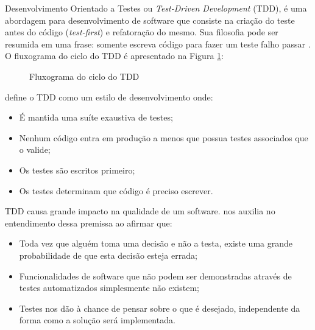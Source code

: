 Desenvolvimento Orientado a Testes ou \textit{Test-Driven Development} (TDD), é uma abordagem para desenvolvimento de software que consiste na criação do teste antes do código (\textit{test-first}) e refatoração do mesmo. Sua filosofia pode ser resumida em uma frase: somente escreva código para fazer um teste falho passar \cite{KOSKELA}. O fluxograma do ciclo do TDD é apresentado na Figura \ref{tdd}:

\begin{figure}[ht]
    \centering
    \caption{Fluxograma do ciclo do TDD}
    \label{tdd}
\end{figure}

 define o TDD como um estilo de desenvolvimento onde:
\begin{itemize}
    \item{É mantida uma suíte exaustiva de testes;}
    \item{Nenhum código entra em produção a menos que possua testes associados que o valide;}
    \item{Os testes são escritos primeiro;}
    \item{Os testes determinam que código é preciso escrever.}
\end{itemize}

TDD causa grande impacto na qualidade de um software.  nos auxilia no entendimento dessa premissa ao afirmar que:
\begin{itemize}
    \item{Toda vez que alguém toma uma decisão e não a testa, existe uma grande probabilidade de que esta decisão esteja errada;}
    \item{Funcionalidades de software que não podem ser demonstradas através de testes automatizados simplesmente não existem;}
    \item{Testes nos dão à chance de pensar sobre o que é desejado, independente da forma como a solução será implementada.}
\end{itemize}

